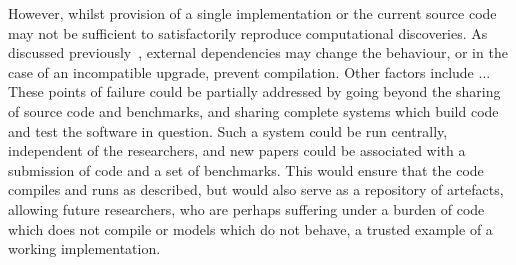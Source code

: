 \documentclass{llncs}
\begin{document}




However, whilst provision of a single implementation or the current
source code may not be sufficient to satisfactorily reproduce
computational discoveries.  As discussed
previously~\cite{crick-et-al_recomp2014}, external dependencies may
change the behaviour, or in the case of an incompatible upgrade,
prevent compilation. Other factors include ... These points of failure
could be partially addressed by going beyond the sharing of source
code and benchmarks, and sharing complete systems which build code and
test the software in question. Such a system could be run centrally,
independent of the researchers, and new papers could be associated
with a submission of code and a set of benchmarks. This would ensure
that the code compiles and runs as described, but would also serve as
a repository of artefacts, allowing future researchers, who are
perhaps suffering under a burden of code which does not compile or
models which do not behave, a trusted example of a working
implementation.
\end{document}

